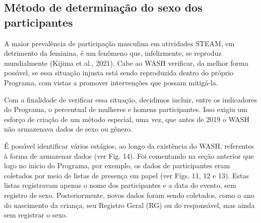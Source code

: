 \documentclass[
12pt,		%
openright,	%
twoside,  %
a4paper,			%
chapter=TITLE,		%
english,			%
french,				%
spanish,			%
brazil				%
]{USPSC-classe/USPSC}
\begin{document}
\subsection[M\'etodo de determina\c{c}\~ao do sexo dos participantes]{M\'etodo de determina\c{c}\~ao do sexo dos participantes}\label{M\'etodo de determina\c{c}\~ao do sexo dos participantes}
A maior preval\^encia de participa\c{c}\~ao masculina em atividades STEAM, em detrimento da feminina, \'e um fen\^omeno que, infelizmente, se reproduz mundialmente (Kijima et al., 2021). Cabe ao WASH verificar, da melhor forma poss\'{\i}vel, se essa situa\c{c}\~ao injusta est\'a sendo reproduzida dentro do pr\'oprio Programa, com vistas a promover interven\c{c}\~oes que possam mitig\'a-la.

















Com a finalidade de verificar essa situa\c{c}\~ao, decidimos incluir, entre os indicadores do Programa, o percentual de mulheres e homens participantes. Isso exigiu um esfor\c{c}o de cria\c{c}\~ao de um m\'etodo especial, uma vez, que antes de 2019 o WASH n\~ao armazenava dados de sexo ou g\^enero.

















\'E poss\'{\i}vel identificar v\'arios est\'agios, ao longo da exist\^encia do WASH, referentes \`a forma de armazenar dados (ver Fig. 14). Foi comentando na se\c{c}\~ao anterior que logo no in\'{\i}cio do Programa, por exemplo, os dados de participantes eram coletados por meio de listas de presen\c{c}a em papel (ver Figs. 11, 12 e 13). Estas listas registravam apenas o nome dos participantes e a data do evento, sem registro de sexo. Posteriormente, novos dados foram sendo coletados, como o ano do nascimento da crian\c{c}a, seu Registro Geral (RG) ou do respons\'avel, mas ainda sem registrar o sexo.
\end{document}
